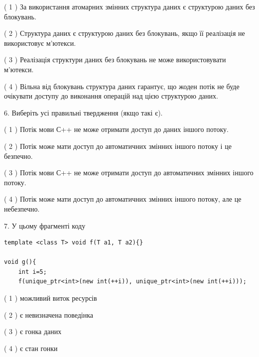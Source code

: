 \documentclass[12pt, ukrainian]{article}
\begin{document}
\begin {large}
{( 1 ) За використання атомарних змінних структура даних є структурою даних без блокувань.%

( 2 ) Структура даних є структурою даних без блокувань, якщо її реалізація не використовує м’ютекси.%

( 3 ) Реалізація структури даних без блокувань не може використовувати м’ютекси.%

( 4 ) Вільна від блокувань структура даних гарантує, що жоден потік не буде очікувати доступу до виконання операцій над цією структурою даних.%
\newpage



\vspace{5mm}
6. Виберіть усі правильні твердження (якщо такі є).\par
\vspace{2mm}

( 1 ) Потік мови С++ не може отримати доступ до даних іншого потоку.%

( 2 ) Потік може мати доступ до автоматичних змінних іншого потоку і це безпечно.%

( 3 ) Потік мови С++ не може отримати доступ до автоматичних змінних іншого потоку.%

( 4 ) Потік може мати доступ до автоматичних змінних іншого потоку, але це небезпечно.%


\vspace{5mm}
7. У цьому фрагменті коду
\begin{verbatim}
template <class T> void f(T a1, T a2){}

void g(){
    int i=5;
    f(unique_ptr<int>(new int(++i)), unique_ptr<int>(new int(++i)));
\end{verbatim}

( 1 ) можливий виток ресурсів%

( 2 ) є невизначена поведінка%

( 3 ) є гонка даних%

( 4 ) є стан гонки%
}
\end {large}
\end{document}
